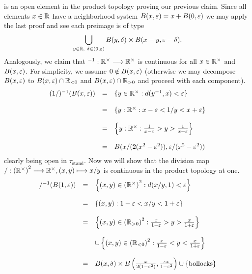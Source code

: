 is an open element in the product topology proving our previous claim. Since all elements $x \in \rz$ have a neighborhood system $B(x,\eps) = x + B(0,\eps)$ we may apply the last proof and see each preimage is of type
$$\bigcup_{y \in \rz,\ \delta \in (0,\eps)} B(y,\delta) \times B(x - y, \eps - \delta).$$
Analogously, we claim that $^{-1} : \rz^\times \longrightarrow \rz^\times$ is continuous for all $x \in \rz^\times$ and $B(x,\eps)$. For simplicity, we assume $0 \notin B(x,\eps)$ (otherwise we may decompose $B(x,\eps)$ to $B(x,\eps) \cap \rz_{<0}$ and $B(x,\eps) \cap \rz_{>0}$ and proceed with each component).
$$\bao{rcl}
(1/)^{-1}(B(x,\eps)) &=& \{y \in \rz^\times : d(y^{-1},x) < \eps\}\\
&&\\
&=& \{y : \rz^\times : x - \eps < 1/y < x + \eps\}\\
&&\\
&=& \left\{y : \rz^\times : \frac{1}{x - \eps} > y > \frac{1}{x + \eps}\right\}\\
&&\\
&=& B(x/(2(x^2 - \eps^2)), \eps/(x^2 - \eps^2))\\
\ea$$
clearly being open in $\tau_{\mathrm{stand}}$. Now we will show that the division map $/ : \left(\rz^\times\right)^2 \longrightarrow \rz^\times, (x,y) \longmapsto x/y$ is continuous in the product topology at one.
$$\bao{rcl}
/^{-1}(B(1,\eps)) &=& \left\{(x,y) \in \left(\rz^\times\right)^2 : d(x/y, 1) < \eps\right\}\\
&&\\
&=& \{(x,y) : 1 - \eps < x/y < 1 + \eps\}\\
&&\\
&=& \left\{(x,y) \in \left(\rz_{>0}\right)^2 : \frac{x}{1 - \eps} > y > \frac{x}{1 + \eps}\right\}\\&&\\&& \cup \left\{(x,y) \in \left(\rz_{<0}\right)^2: \frac{x}{1 - \eps} < y < \frac{x}{1 + \eps}\right\}\\
&&\\
&=& B(x,\delta) \times B\left(\frac{x}{2(1 - \eps^2)}, \frac{\eps x}{1 - \eps^2}\right) \cup \{\mathrm{bollocks}\}\\
\ea$$
